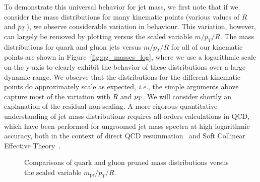 To demonstrate this universal behavior for jet mass, we first note that if we consider the mass distributions for many kinematic points (various values of $R$ and $p_T$),
we observe considerable variation in behaviour. This variation, however, can largely be removed by plotting versus the scaled variable $m/p_T/R$.  The mass distributions for quark and gluon jets versus $m/p_T/R$ for all of our kinematic points 
are shown in Figure~\ref{fig:qg_masses_log}, where
we use a logarithmic scale on the y-axis to clearly exhibit the behavior of these distributions over a large dynamic range.  We observe that the distributions
for the different kinematic points do approximately scale as expected, \textit{i.e.}, the simple arguments above capture most of the variation with $R$ and $p_T$.
We will consider shortly an explanation of the residual non-scaling. A more rigorous quantitative understanding of jet mass distributions requires all-orders calculations in QCD, which have been performed for ungroomed jet mass spectra at high logarithmic accuracy, both in the context of direct QCD resummation~\cite{Li:2012bw,Dasgupta:2012hg} and Soft Collinear Effective Theory~\cite{Chien:2012ur,Jouttenus:2013hs}. 

\begin{figure}
\centering
{}
\caption{Comparisons of quark and gluon pruned mass distributions versus the scaled variable $m_\text{pr}/p_T/R$. }
\label{fig:qg_prmasses_log}
\end{figure}

